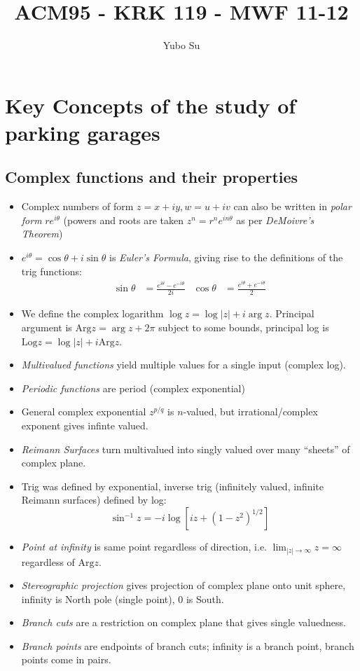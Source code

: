\documentclass[10pt]{report}
\newcommand{\Log}[0]{\mathrm{Log} }
\newcommand{\Arg}[0]{\mathrm{Arg} }
\begin{document}
\title{ACM95 - KRK 119 - MWF 11-12}
\author{Yubo Su}
\date{ }

\maketitle

\tableofcontents

\chapter{Key Concepts of the study of parking garages}

\section{Complex functions and their properties}
\begin{itemize}
	\item Complex numbers of form $z=x+iy, w=u+iv$ can also be written in \emph{polar form} $re^{i\theta}$ (powers and roots are taken $z^n=r^ne^{in\theta}$ as per \emph{DeMoivre's Theorem})
	\item $e^{i\theta}=\cos\theta+i\sin\theta$ is \emph{Euler's Formula}, giving rise to the definitions of the trig functions:
		\begin{align*}
			\sin\theta &= \frac{e^{i\theta}-e^{-i\theta}}{2i} & \cos\theta&= \frac{e^{i\theta}+e^{-i\theta}}{2}
		\end{align*}
	\item We define the complex logarithm $\log z = \log|z| + i\arg z$. Principal argument is $\Arg z = \arg z + 2\pi$ subject to some bounds, principal log is $\Log z =\log|z| + i\Arg z$. 
	\item \emph{Multivalued functions} yield multiple values for a single input (complex log).
	\item \emph{Periodic functions} are period (complex exponential)
	\item General complex exponential $z^{p/q}$ is $n$-valued, but irrational/complex exponent gives infinte valued.
	\item \emph{Reimann Surfaces} turn multivalued into singly valued over many ``sheets'' of complex plane.
	\item Trig was defined by exponential, inverse trig (infinitely valued, infinite Reimann surfaces) defined by log:
		$$\sin^{-1}z=-i\log\left[ iz+\left( 1-z^2 \right)^{1/2} \right]$$
	\item \emph{Point at infinity} is same point regardless of direction, i.e. $\lim_{|z| \to\infty} z = \infty$ regardless of $\Arg z$. 
	\item \emph{Stereographic projection} gives projection of complex plane onto unit sphere, infinity is North pole (single point), 0 is South.
	\item \emph{Branch cuts} are a restriction on complex plane that gives single valuedness.
	\item \emph{Branch points} are endpoints of branch cuts; infinity is a branch point, branch points come in pairs. 
\end{itemize}
\end{document}
